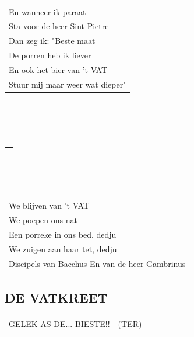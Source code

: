 \documentclass{article}
\begin{document}
\\\\\\
\begin{tabularx}{\textwidth}{>{\raggedright\arraybackslash}X}
En wanneer ik paraat\\
Sta voor de heer Sint Pietre\\
Dan zeg ik: "Beste maat\\
De porren heb ik liever\\
En ook het bier van ’t VAT\\
Stuur mij maar weer wat dieper" \\
\end{tabularx}
\\\\\\
\begin{tabularx}{\textwidth}{>{\raggedright\arraybackslash}X}
    {\small (Laatste refrein:)}\\
\end{tabularx}
\\\\\\
\begin{tabularx}{\textwidth}{>{\raggedright\arraybackslash}X}
We blijven van ’t VAT\\
We poepen ons nat\\
Een porreke in ons bed, dedju\\
We zuigen aan haar tet, dedju\\
Discipels van Bacchus En van de heer Gambrinus    \\
\end{tabularx}
\subsection*{DE VATKREET}
\begin{tabularx}{\textwidth}{>{\raggedright\arraybackslash}X c}
    GELEK AS DE... BIESTE!! & (TER)
\end{tabularx}
\end{document}

